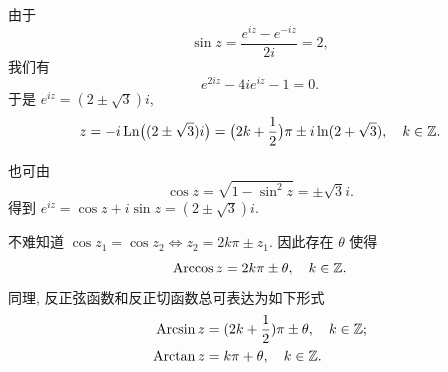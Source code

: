 \begin{solution}
  由于
  \[
    \sin z=\dfrac{e^{iz}-e^{-iz}}{2i}=2,
  \]
  我们有
  \[
    e^{2iz}-4ie^{iz}-1=0.
  \]
  于是 $e^{iz}=(2\pm\sqrt 3)i$,
  \[
    z=-i\operatorname{Ln}\bigl((2\pm\sqrt 3)i\bigr)
     =\bigl(2k+\frac{1}{2}\bigr)\pi\pm i\ln(2+\sqrt3),
      \quad k\in{\mathbb{Z}}.
  \]
\end{solution}

也可由
\[
  \cos z=\sqrt{1-\sin^2 z}=\pm\sqrt 3i.
\]
得到 $e^{iz}=\cos z+i\sin z=(2\pm\sqrt 3)i$.

不难知道 $\cos z_1=\cos z_2\iff z_2=2k\pi\pm z_1$.
因此存在 $\theta$ 使得
\[
  \operatorname{Arccos} z=2k\pi\pm \theta,\quad k\in{\mathbb{Z}}.
\]
同理, 反正弦函数和反正切函数总可表达为如下形式
\begin{align*}
  \operatorname{Arcsin} z&=(2k+\frac{1}{2})\pi\pm \theta,\quad k\in{\mathbb{Z}};\\
  \operatorname{Arctan} z&=k\pi+\theta,\quad k\in{\mathbb{Z}}.
\end{align*}



